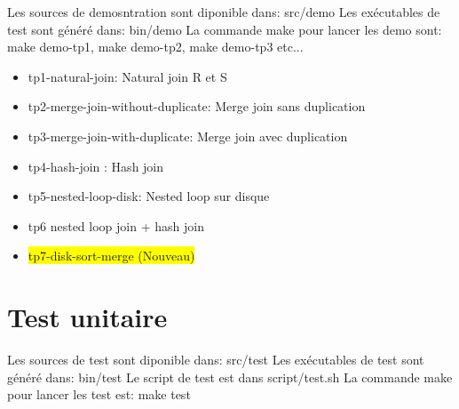\documentclass[a4paper]{article}
\begin{document}
Les sources de demosntration sont diponible dans: src/demo
Les exécutables de test sont généré dans: bin/demo
La commande make pour lancer les demo sont: make demo-tp1, make demo-tp2, make demo-tp3 etc...

\begin{itemize}
  \item tp1-natural-join: Natural join R et S
  \item tp2-merge-join-without-duplicate: Merge join sans duplication
  \item tp3-merge-join-with-duplicate: Merge join avec duplication
  \item tp4-hash-join : Hash join
  \item tp5-nested-loop-disk: Nested loop sur disque
  \item tp6 nested loop join + hash join
  \item \colorbox{yellow}{tp7-disk-sort-merge (Nouveau)}
\end{itemize}

\section{Test unitaire}

Les sources de test sont diponible dans: src/test
Les exécutables de test sont généré dans: bin/test
Le script de test est dans script/test.sh
La commande make pour lancer les test est: make test
\end{document}

